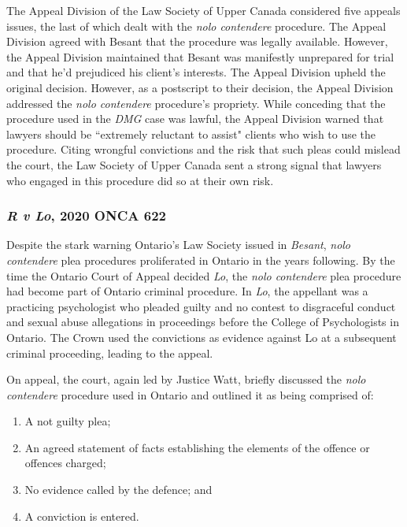 The Appeal Division of the Law Society of Upper Canada considered five appeals issues, the last of which dealt with the \textit{nolo contendere} procedure. The Appeal Division agreed with Besant that the procedure was legally available. However, the Appeal Division maintained that Besant was manifestly unprepared for trial and that he'd prejudiced his client's interests. The Appeal Division upheld the original decision. However, as a postscript to their decision, the Appeal Division addressed the \textit{nolo contendere} procedure's propriety. While conceding that the procedure used in the \textit{DMG} case was lawful, the Appeal Division warned that lawyers should be ``extremely reluctant to assist" clients who wish to use the procedure. Citing wrongful convictions and the risk that such pleas could mislead the court, the Law Society of Upper Canada sent a strong signal that lawyers who engaged in this procedure did so at their own risk.

\subsubsection{\textit{R v Lo}, 2020 ONCA 622}

Despite the stark warning Ontario's Law Society issued in \textit{Besant}, \textit{nolo contendere} plea procedures proliferated in Ontario in the years following. By the time the Ontario Court of Appeal decided \textit{Lo}, the \textit{nolo contendere} plea procedure had become part of Ontario criminal procedure. In \textit{Lo}, the appellant was a practicing psychologist who pleaded guilty and no contest to disgraceful conduct and sexual abuse allegations in proceedings before the College of Psychologists in Ontario. The Crown used the convictions as evidence against Lo at a subsequent criminal proceeding, leading to the appeal.

On appeal, the court, again led by Justice Watt, briefly discussed the \textit{nolo contendere} procedure used in Ontario and outlined it as being comprised of:

\begin{enumerate}
    \item A not guilty plea;
    \item An agreed statement of facts establishing the elements of the offence or offences charged;
    \item No evidence called by the defence; and
    \item A conviction is entered.
\end{enumerate}

